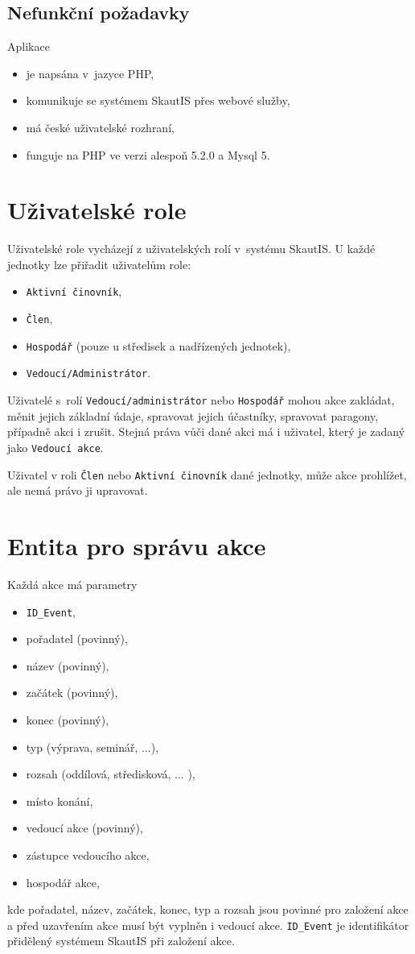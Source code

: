 \documentclass[thesis=B,czech]{FITthesis}[2012/04/27]
\begin{document}
\subsection{Nefunkční požadavky}
Aplikace 
\begin{itemize}
	\item je napsána v~jazyce PHP,
	\item komunikuje se systémem SkautIS přes webové služby,
	\item má české uživatelské rozhraní,
	\item funguje na PHP ve verzi alespoň 5.2.0 a Mysql 5.
\end{itemize}

\section{Uživatelské role}
Uživatelské role vycházejí z uživatelských rolí v~systému SkautIS. U každé jednotky lze přiřadit uživatelům role:
\begin{itemize}
	\item \texttt{Aktivní činovník},
	\item \texttt{Člen},
	\item \texttt{Hospodář} (pouze u středisek a nadřízených jednotek),
	\item \texttt{Vedoucí/Administrátor}.
\end{itemize}

Uživatelé s~rolí \texttt{Vedoucí/administrátor} nebo \texttt{Hospodář} mohou akce zakládat, měnit jejich základní údaje, spravovat jejich účastníky, spravovat parago\-ny, případně akci i zrušit. Stejná práva vůči dané akci má i uživatel, který je zadaný jako \texttt{Vedoucí akce}.

Uživatel v roli \texttt{Člen} nebo \texttt{Aktivní činovník} dané jednotky, může akce prohlížet, ale nemá právo ji upravovat.

\section{Entita pro správu akce}
\label{sec:eventDescription}
Každá akce má parametry
\begin{itemize}
	\item \texttt{ID\_Event},
	\item pořadatel (povinný),
	\item název (povinný),
	\item začátek (povinný),
	\item konec (povinný),
	\item typ (výprava, seminář, ...),
	\item rozsah (oddílová, středisková, ... ),
	\item místo konání,
	\item vedoucí akce (povinný),
	\item zástupce vedoucího akce,
	\item hospodář akce,
\end{itemize}
kde pořadatel, název, začátek, konec, typ a rozsah jsou povinné pro založení akce a před uzavřením akce musí být vyplněn i vedoucí akce. \texttt{ID\_Event} je identifikátor přidělený systémem SkautIS při založení akce.
\end{document}
